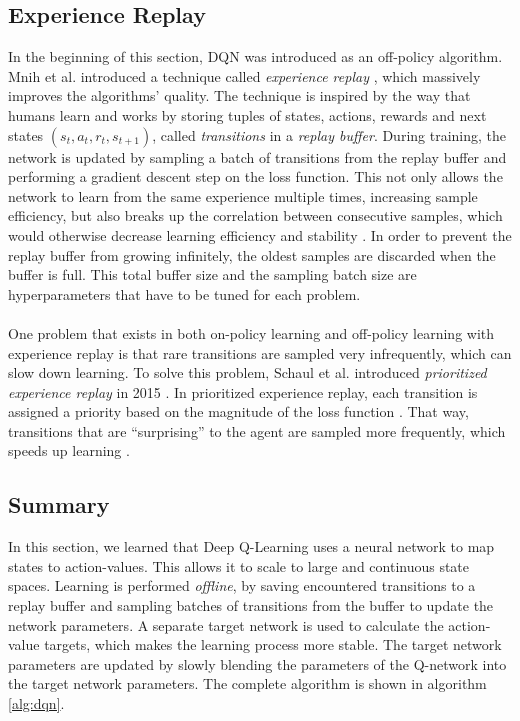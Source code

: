 \subsection{Experience Replay}
\label{subsec:experience-replay}
In the beginning of this section, DQN was introduced as an off-policy algorithm. Mnih et al. introduced a technique called \textit{experience replay} \cite{mnih_human-level_2015}, which massively improves the algorithms' quality. The technique is inspired by the way that humans learn \cite{mnih_human-level_2015} and works by storing tuples of states, actions, rewards and next states $(s_t, a_t, r_t, s_{t+1})$, called \textit{transitions} in a \textit{replay buffer}. During training, the network is updated by sampling a batch of transitions from the replay buffer and performing a gradient descent step on the loss function. This not only allows the network to learn from the same experience multiple times, increasing sample efficiency, but also breaks up the correlation between consecutive samples, which would otherwise decrease learning efficiency and stability \cite{mnih_human-level_2015}. In order to prevent the replay buffer from growing infinitely, the oldest samples are discarded when the buffer is full. This total buffer size and the sampling batch size are hyperparameters that have to be tuned for each problem. 
\\
\\
One problem that exists in both on-policy learning and off-policy learning with experience replay is that rare transitions are sampled very infrequently, which can slow down learning. To solve this problem, Schaul et al. introduced \textit{prioritized experience replay} in 2015 \cite{schaul_prioritized_2016}. In prioritized experience replay, each transition is assigned a priority based on the magnitude of the loss function \cite{schaul_prioritized_2016}. That way, transitions that are \enquote{surprising} to the agent are sampled more frequently, which speeds up learning \cite{schaul_prioritized_2016}.

\subsection{Summary}
In this section, we learned that Deep Q-Learning uses a neural network to map states to action-values. This allows it to scale to large and continuous state spaces. Learning is performed \textit{offline}, by saving encountered transitions to a replay buffer and sampling batches of transitions from the buffer to update the network parameters. A separate target network is used to calculate the action-value targets, which makes the learning process more stable. The target network parameters are updated by slowly blending the parameters of the Q-network into the target network parameters. The complete algorithm is shown in algorithm \ref{alg:dqn}.

